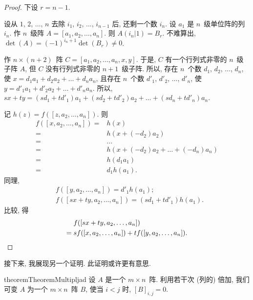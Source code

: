 \documentclass[../libro.tex]{subfiles}
\begin{document}
\begin{proof}
    下设 \(r = n-1\).

    设从 \(1\), \(2\), \(\dots\), \(n\)
    去除 \(i_1\), \(i_2\), \(\dots\), \(i_{n-1}\) 后,
    还剩一个数 \(i_n\).
    设 \(a_1\) 是 \(n\)~级单位阵的列~\(i_n\).
    作 \(n\)~级阵
    \(A = [a_1, a_2, \dots, a_n]\).
    则 \(A(i_n | 1) = B_r\).
    不难算出,
    \(\det {(A)} = (-1)^{i_n + 1} \det {(B_r)} \neq 0\).

    作 \(n \times (n+2)\)~阵
    \(C = [a_1, a_2, \dots, a_n, x, y]\).
    于是, \(C\) 有一个行列式非零的 \(n\)~级子阵 \(A\),
    但 \(C\) 没有行列式非零的 \(n+1\)~级子阵.
    所以,
    存在 \(n\)~个数
    \(d_1\), \(d_2\), \(\dots\), \(d_n\),
    使
    \(x = d_1 a_1 + d_2 a_2 + \dots + d_n a_n\),
    且存在 \(n\)~个数
    \(d'_1\), \(d'_2\), \(\dots\), \(d'_n\),
    使
    \(y = d'_1 a_1 + d'_2 a_2 + \dots + d'_n a_n\).
    所以,
    \(sx + ty
        = (sd_1 + td'_1) a_1
        + (sd_2 + td'_2) a_2
        + \dots
    + (sd_n + td'_n) a_n\).

    记 \(h(z) = f ([z, a_2, \dots, a_n])\).
    则
    \begin{align*}
        f ([x, a_2, \dots, a_n])
        = {} & h(x)
        \\
        = {} & h(x + (-d_2) a_2)
        \\
        = {} & \dots
        \\
        = {} & h(x + (-d_2) a_2 + \dots + (-d_n) a_n)
        \\
        = {} & h(d_1 a_1)
        \\
        = {} & d_1 h(a_1).
    \end{align*}
    同理,
    \begin{align*}
        & f ([y, a_2, \dots, a_n]) = d'_1 h(a_1);
        \\
        & f ([sx + ty, a_2, \dots, a_n]) = (sd_1 + td'_1) h(a_1).
    \end{align*}
    比较, 得
    \begin{align*}
        &
        f([sx + ty, a_2, \dots, a_n])
        \\
        = {} &
        s f([x, a_2, \dots, a_n])
        + t f([y, a_2, \dots, a_n]).
        \qedhere
    \end{align*}
\end{proof}

接下来, 我展现另一个证明.
此证明或许更有意思.

\begin{restatable}{theorem}{TheoremMultipljad}
    设 \(A\) 是一个 \(m \times n\)~阵.
    利用若干次 (列的) 倍加,
    我们可变 \(A\) 为一个 \(m \times n\)~阵 \(B\),
    使当 \(i < j\) 时,
    \([B]_{i,j} = 0\).
\end{restatable}
\end{document}
